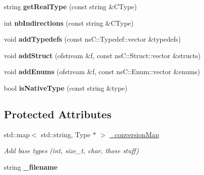 \begin{DoxyCompactItemize}
\item 
\hypertarget{classnsJNI_1_1TypesDictionnary_a5b276e3bd46d856b6f7bc11070e3474a}{string {\bfseries get\-Real\-Type} (const string \&\-C\-Type)}\label{classnsJNI_1_1TypesDictionnary_a5b276e3bd46d856b6f7bc11070e3474a}

\item 
\hypertarget{classnsJNI_1_1TypesDictionnary_ac0bcfa22be2b6a0489fcda4f6dc8ae0e}{int {\bfseries nb\-Indirections} (const string \&\-C\-Type)}\label{classnsJNI_1_1TypesDictionnary_ac0bcfa22be2b6a0489fcda4f6dc8ae0e}

\item 
\hypertarget{classnsJNI_1_1TypesDictionnary_afc9e58f215b7706e20aa076a58ae3498}{void {\bfseries add\-Typedefs} (const ns\-C\-::\-Typedef\-::vector \&typedefs)}\label{classnsJNI_1_1TypesDictionnary_afc9e58f215b7706e20aa076a58ae3498}

\item 
\hypertarget{classnsJNI_1_1TypesDictionnary_a7970e8098121a85e6af1e3c366eedad5}{void {\bfseries add\-Struct} (ofstream \&f, const ns\-C\-::\-Struct\-::vector \&structs)}\label{classnsJNI_1_1TypesDictionnary_a7970e8098121a85e6af1e3c366eedad5}

\item 
\hypertarget{classnsJNI_1_1TypesDictionnary_ae09bba323c493832ff51bec01dfbf2c2}{void {\bfseries add\-Enums} (ofstream \&f, const ns\-C\-::\-Enum\-::vector \&enums)}\label{classnsJNI_1_1TypesDictionnary_ae09bba323c493832ff51bec01dfbf2c2}

\item 
\hypertarget{classnsJNI_1_1TypesDictionnary_ae4751b3e2347e280221d599606d14630}{bool {\bfseries is\-Native\-Type} (const string \&type)}\label{classnsJNI_1_1TypesDictionnary_ae4751b3e2347e280221d599606d14630}

\end{DoxyCompactItemize}
\subsection*{\-Protected \-Attributes}
\begin{DoxyCompactItemize}
\item 
\hypertarget{classnsJNI_1_1TypesDictionnary_a7f05e27574bc6e44fe87380b9b46c57a}{std\-::map$<$ std\-::string, \-Type $\ast$ $>$ \hyperlink{classnsJNI_1_1TypesDictionnary_a7f05e27574bc6e44fe87380b9b46c57a}{\-\_\-conversion\-Map}}\label{classnsJNI_1_1TypesDictionnary_a7f05e27574bc6e44fe87380b9b46c57a}

\begin{DoxyCompactList}\small\item\em \-Add base types (int, size\-\_\-t, char, those stuff) \end{DoxyCompactList}\item 
\hypertarget{classnsJNI_1_1TypesDictionnary_a9066a547e0b24e99567378f5ea01f87f}{string {\bfseries \-\_\-filename}}\label{classnsJNI_1_1TypesDictionnary_a9066a547e0b24e99567378f5ea01f87f}

\end{DoxyCompactItemize}



